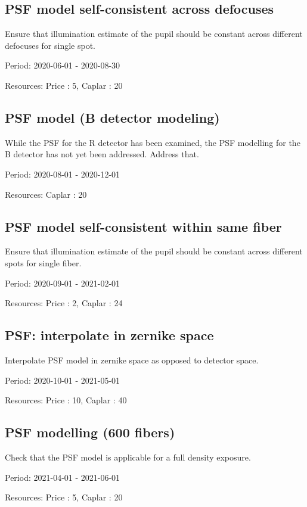 \subsection{PSF model self-consistent across defocuses}

Ensure that illumination estimate of the pupil should be constant across different defocuses for single spot.

Period: 2020-06-01 - 2020-08-30

Resources: Price : 5, Caplar : 20

\subsection{PSF model (B detector modeling)}

While the PSF for the R detector has been examined, the PSF modelling for the B detector has not yet been addressed. Address that.

Period: 2020-08-01 - 2020-12-01

Resources: Caplar : 20

\subsection{PSF model self-consistent within same fiber}

Ensure that illumination estimate of the pupil should be constant across different spots for single fiber.

Period: 2020-09-01 - 2021-02-01

Resources: Price : 2, Caplar : 24

\subsection{PSF: interpolate in zernike space}

Interpolate PSF model in zernike space as opposed to detector space.

Period: 2020-10-01 - 2021-05-01

Resources: Price : 10, Caplar : 40

\subsection{PSF modelling (600 fibers)}

Check that the PSF model is applicable for a full density exposure.

Period: 2021-04-01 - 2021-06-01

Resources: Price : 5, Caplar : 20

